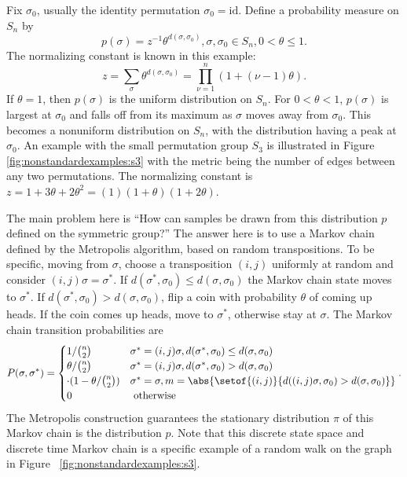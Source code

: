 \documentclass[12pt]{article}
\begin{document}
Fix \( \sigma_0 \), usually the identity permutation \( \sigma_0 = \text
{id} \). Define a probability measure on \( S_n \) by
\[
    p(\sigma) = z^{-1}\theta^{d(\sigma,\sigma_0)}, \sigma, \sigma_0 \in
    S_n, 0 < \theta \le 1.
\] The normalizing constant is known in this example:
\[
    z = \sum\limits_{\sigma} \theta^{d(\sigma,\sigma_0)} = \prod_{\nu=1}^n
    (1 + (\nu-1)\theta).
\] If \( \theta = 1 \), then \( p(\sigma) \) is the uniform distribution
on \( S_n \).  For \( 0 < \theta < 1 \), \( p(\sigma) \) is largest at \(
\sigma_0 \) and falls off from its maximum as \( \sigma \) moves away
from \( \sigma_0 \).  This becomes a nonuniform distribution on \( S_n \),
with the distribution having a peak at \( \sigma_0 \).  An example with
the small permutation group \( S_3 \) is illustrated in Figure~%
\ref{fig:nonstandardexamples:s3} with the metric being the number of
edges between any two permutations.  The normalizing constant is \( z =
1 + 3 \theta + 2 \theta^2 = (1)(1 + \theta)(1 + 2 \theta) \).

The main problem here is ``How can samples be drawn from this
distribution \( p \) defined on the symmetric group?'' The answer here
is to use a Markov chain defined by the Metropolis algorithm, based on
random transpositions.%
To be specific, moving from \( \sigma \), choose a transposition \( (i,j)
\) uniformly at random and consider \( (i,j)\sigma = \sigma^{*} \).  If \(
d(\sigma^{*}, \sigma_0) \le d(\sigma, \sigma_0) \) the Markov chain
state moves to \( \sigma^{*} \).  If \( d(\sigma^{*}, \sigma_0) > d(\sigma,
\sigma_0) \), flip a coin with probability \( \theta \) of coming up
heads.  If the coin comes up heads, move to \( \sigma^{*} \), otherwise
stay at \( \sigma \).  The Markov chain transition probabilities are
\[
    P(\sigma, \sigma^{*}) =
    \begin{cases}
        1/\binom{n}{2} & \sigma^{*} = (i,j)\sigma, d(\sigma^{*}, \sigma_0)
        \le d(\sigma, \sigma_0) \\
        \theta/\binom{n}{2} & \sigma^{*} = (i,j)\sigma, d(\sigma^{*},
        \sigma_0) > d(\sigma, \sigma_0) \\
        \cdot (1 - \theta/\binom{n}{2}) & \sigma^{*} = \sigma, m = \abs{%
        \setof{(i,j)}{d((i,j)\sigma, \sigma_0) > d(\sigma, \sigma_0)}}
        \\
        0 & \text{ otherwise}
    \end{cases}
    .
\] The Metropolis construction guarantees the stationary distribution \(
\pi \) of this Markov chain is the distribution \( p \).  Note that this
discrete state space and discrete time Markov chain is a specific
example of a random walk on the graph in Figure~%
\ref{fig:nonstandardexamples:s3}.
\end{document}

